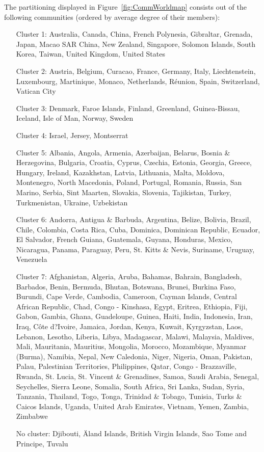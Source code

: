 The partitioning displayed in Figure~\ref{fig:CommWorldmap} consists out of the following communities (ordered by average degree of their members):

\begin{enumerate}
	\item[Cluster 1:]	Australia, Canada, China, French Polynesia, Gibraltar, Grenada, Japan, Macao SAR China, New Zealand, Singapore, Solomon Islands, South Korea, Taiwan, United Kingdom, United States 
	\item[Cluster 2:] Austria, Belgium, Curacao, France, Germany, Italy, Liechtenstein, Luxembourg, Martinique, Monaco, Netherlands, Réunion, Spain, Switzerland, Vatican City 
	\item[Cluster 3:] Denmark, Faroe Islands, Finland, Greenland, Guinea-Bissau, Iceland, Isle of Man, Norway, Sweden 
	\item[Cluster 4:] Israel, Jersey, Montserrat 
	\item[Cluster 5:] Albania, Angola, Armenia, Azerbaijan, Belarus, Bosnia \& Herzegovina, Bulgaria, Croatia, Cyprus, Czechia, Estonia, Georgia, Greece, Hungary, Ireland, Kazakhstan, Latvia, Lithuania, Malta, Moldova, Montenegro, North Macedonia, Poland, Portugal, Romania, Russia, San Marino, Serbia, Sint Maarten, Slovakia, Slovenia, Tajikistan, Turkey, Turkmenistan, Ukraine, Uzbekistan 
	\item[Cluster 6:] Andorra, Antigua \& Barbuda, Argentina, Belize, Bolivia, Brazil, Chile, Colombia, Costa Rica, Cuba, Dominica, Dominican Republic, Ecuador, El Salvador, French Guiana, Guatemala, Guyana, Honduras, Mexico, Nicaragua, Panama, Paraguay, Peru, St. Kitts \& Nevis, Suriname, Uruguay, Venezuela 
	\item[Cluster 7:] Afghanistan, Algeria, Aruba, Bahamas, Bahrain, Bangladesh, Barbados, Benin, Bermuda, Bhutan, Botswana, Brunei, Burkina Faso, Burundi, Cape Verde, Cambodia, Cameroon, Cayman Islands, Central African Republic, Chad, Congo - Kinshasa, Egypt, Eritrea, Ethiopia, Fiji, Gabon, Gambia, Ghana, Guadeloupe, Guinea, Haiti, India, Indonesia, Iran, Iraq, Côte d?Ivoire, Jamaica, Jordan, Kenya, Kuwait, Kyrgyzstan, Laos, Lebanon, Lesotho, Liberia, Libya, Madagascar, Malawi, Malaysia, Maldives, Mali, Mauritania, Mauritius, Mongolia, Morocco, Mozambique, Myanmar (Burma), Namibia, Nepal, New Caledonia, Niger, Nigeria, Oman, Pakistan, Palau, Palestinian Territories, Philippines, Qatar, Congo - Brazzaville, Rwanda, St. Lucia, St. Vincent \& Grenadines, Samoa, Saudi Arabia, Senegal, Seychelles, Sierra Leone, Somalia, South Africa, Sri Lanka, Sudan, Syria, Tanzania, Thailand, Togo, Tonga, Trinidad \& Tobago, Tunisia, Turks \& Caicos Islands, Uganda, United Arab Emirates, Vietnam, Yemen, Zambia, Zimbabwe 
	\item[No cluster:] Djibouti, \"Aland Islands, British Virgin Islands, Sao Tome and Principe, Tuvalu
\end{enumerate}


